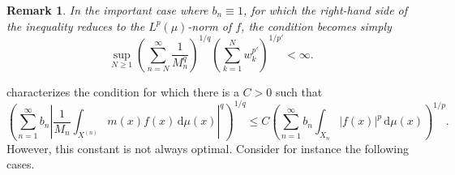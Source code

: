 \documentclass[oneside,10pt]{article}          %
\newtheorem{rem}{Remark}
\numberwithin{equation}{section}
\begin{document}
\begin{rem}
    In the important case where $b_n\equiv1$, for which the right-hand side of the inequality reduces to the $L^p(\mu)$-norm of $f$, the condition becomes simply
    \[
    \sup_{N\geq 1} \left( \sum_{n=N}^{\infty}\frac{1}{M_n^q} \right)^{\!\!1/q}\! \left(\sum_{k=1}^{N}w_k^{p'} \right)^{\!\!1/p'} \!< \infty.
    \]
\end{rem}



 characterizes the condition for which there is a $C>0$ such that
\[
\left(\sum_{n=1}^{\infty} b_n \left| \frac{1}{M_n} \int_{X^{(n)}}m(x)f(x)\,\mathrm{d}\mu(x) \right|^q \right)^{\!\!1/q}\!\! \leq C \left( \sum_{n=1}^{\infty} b_n \int_{X_n}|f(x)|^p\,\mathrm{d}\mu(x) \right)^{\!\!1/p}.
\]
However, this constant is not always optimal. Consider for instance the following cases.
\end{document}
